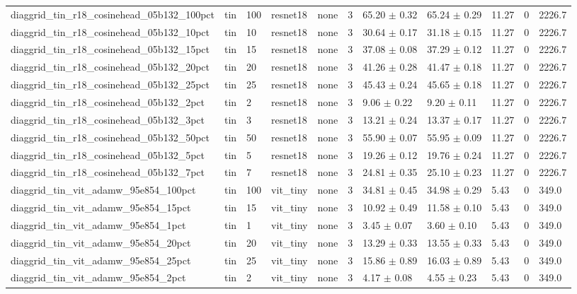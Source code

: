 \begin{tabular}{lllllllllll}
diaggrid_tin_r18_cosinehead_05b132_100pct & tin & 100 & resnet18 & none & 3 & 65.20 $\pm$ 0.32 & 65.24 $\pm$ 0.29 & 11.27 & 0 & 2226.7 \\
diaggrid_tin_r18_cosinehead_05b132_10pct & tin & 10 & resnet18 & none & 3 & 30.64 $\pm$ 0.17 & 31.18 $\pm$ 0.15 & 11.27 & 0 & 2226.7 \\
diaggrid_tin_r18_cosinehead_05b132_15pct & tin & 15 & resnet18 & none & 3 & 37.08 $\pm$ 0.08 & 37.29 $\pm$ 0.12 & 11.27 & 0 & 2226.7 \\
diaggrid_tin_r18_cosinehead_05b132_20pct & tin & 20 & resnet18 & none & 3 & 41.26 $\pm$ 0.28 & 41.47 $\pm$ 0.18 & 11.27 & 0 & 2226.7 \\
diaggrid_tin_r18_cosinehead_05b132_25pct & tin & 25 & resnet18 & none & 3 & 45.43 $\pm$ 0.24 & 45.65 $\pm$ 0.18 & 11.27 & 0 & 2226.7 \\
diaggrid_tin_r18_cosinehead_05b132_2pct & tin & 2 & resnet18 & none & 3 & 9.06 $\pm$ 0.22 & 9.20 $\pm$ 0.11 & 11.27 & 0 & 2226.7 \\
diaggrid_tin_r18_cosinehead_05b132_3pct & tin & 3 & resnet18 & none & 3 & 13.21 $\pm$ 0.24 & 13.37 $\pm$ 0.17 & 11.27 & 0 & 2226.7 \\
diaggrid_tin_r18_cosinehead_05b132_50pct & tin & 50 & resnet18 & none & 3 & 55.90 $\pm$ 0.07 & 55.95 $\pm$ 0.09 & 11.27 & 0 & 2226.7 \\
diaggrid_tin_r18_cosinehead_05b132_5pct & tin & 5 & resnet18 & none & 3 & 19.26 $\pm$ 0.12 & 19.76 $\pm$ 0.24 & 11.27 & 0 & 2226.7 \\
diaggrid_tin_r18_cosinehead_05b132_7pct & tin & 7 & resnet18 & none & 3 & 24.81 $\pm$ 0.35 & 25.10 $\pm$ 0.23 & 11.27 & 0 & 2226.7 \\
diaggrid_tin_vit_adamw_95e854_100pct & tin & 100 & vit_tiny & none & 3 & 34.81 $\pm$ 0.45 & 34.98 $\pm$ 0.29 & 5.43 & 0 & 349.0 \\
diaggrid_tin_vit_adamw_95e854_15pct & tin & 15 & vit_tiny & none & 3 & 10.92 $\pm$ 0.49 & 11.58 $\pm$ 0.10 & 5.43 & 0 & 349.0 \\
diaggrid_tin_vit_adamw_95e854_1pct & tin & 1 & vit_tiny & none & 3 & 3.45 $\pm$ 0.07 & 3.60 $\pm$ 0.10 & 5.43 & 0 & 349.0 \\
diaggrid_tin_vit_adamw_95e854_20pct & tin & 20 & vit_tiny & none & 3 & 13.29 $\pm$ 0.33 & 13.55 $\pm$ 0.33 & 5.43 & 0 & 349.0 \\
diaggrid_tin_vit_adamw_95e854_25pct & tin & 25 & vit_tiny & none & 3 & 15.86 $\pm$ 0.89 & 16.03 $\pm$ 0.89 & 5.43 & 0 & 349.0 \\
diaggrid_tin_vit_adamw_95e854_2pct & tin & 2 & vit_tiny & none & 3 & 4.17 $\pm$ 0.08 & 4.55 $\pm$ 0.23 & 5.43 & 0 & 349.0 \\

\end{tabular}
